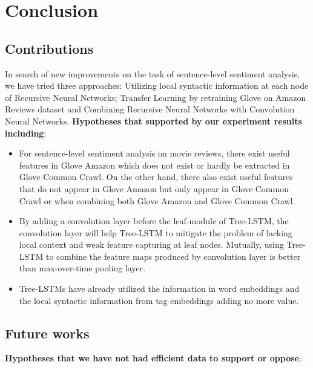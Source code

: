 \hypertarget{chap:conclude}{\chapter{Conclusion}}\label{conclusion}
\section{Contributions}
In search of new improvements on the task of sentence-level sentiment analysis, we have tried three approaches: Utilizing local syntactic information at each node of Recursive Neural Networks; Transfer Learning by retraining Glove on Amazon Reviews dataset and Combining Recursive Neural Networks with Convolution Neural Networks.
\textbf{Hypotheses that supported by our experiment results including}:
\begin{itemize}

\item For sentence-level sentiment analysis on movie reviews, there exist useful features in Glove Amazon which does not exist or hardly be extracted in Glove Common Crawl.
On the other hand, there also exist useful features that do not appear in Glove Amazon but only appear in Glove Common Crawl or when combining both Glove Amazon and Glove Common Crawl.

\item By adding a convolution layer before the leaf-module of Tree-LSTM, the convolution layer will help Tree-LSTM to mitigate the problem of lacking local context and weak feature capturing at leaf nodes.
Mutually, using Tree-LSTM to combine the feature maps produced by convolution layer is better than max-over-time pooling layer.

\item  Tree-LSTMs have already utilized the information in word embeddings and the local syntactic information from tag embeddings adding no more value. 
\end{itemize}

\section{Future works}
\label{unproved-hypo}
\textbf{Hypotheses that we have not had efficient data to support or oppose}:

